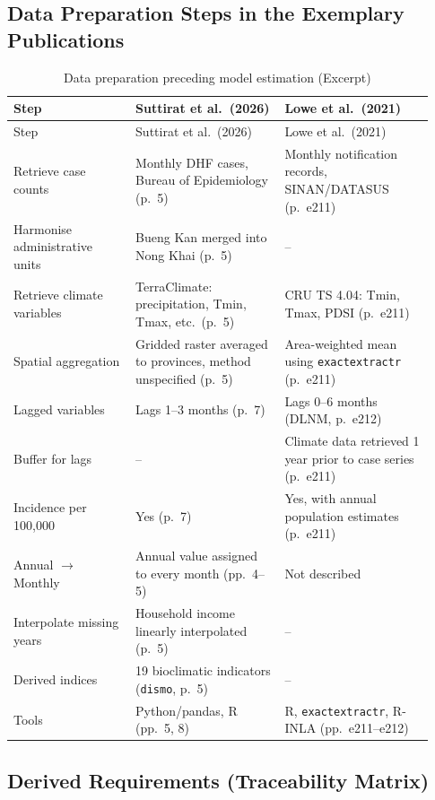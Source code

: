 \documentclass[11pt,a4paper]{article}
\begin{document}
\subsection{Data Preparation Steps in the Exemplary Publications}

\begin{longtable}{@{}p{0.27\linewidth}p{0.33\linewidth}p{0.33\linewidth}@{}}
\caption{Data preparation preceding model estimation (Excerpt)}\label{tab:steps}\\
\toprule
Step & Suttirat et al.\ (2026) & Lowe et al.\ (2021) \\
\midrule
\endfirsthead
\toprule
Step & Suttirat et al.\ (2026) & Lowe et al.\ (2021) \\
\midrule
\endhead
Retrieve case counts & Monthly DHF cases, Bureau of Epidemiology (p.~5) &
  Monthly notification records, SINAN/DATASUS (p.~e211) \\
Harmonise administrative units & Bueng Kan merged into Nong Khai (p.~5) & -- \\
Retrieve climate variables & TerraClimate: precipitation, Tmin, Tmax, etc.\ (p.~5) &
  CRU TS 4.04: Tmin, Tmax, PDSI (p.~e211) \\
Spatial aggregation & Gridded raster averaged to provinces, method unspecified (p.~5) &
  Area-weighted mean using \texttt{exactextractr} (p.~e211) \\
Lagged variables & Lags 1--3 months (p.~7) & Lags 0--6 months (DLNM, p.~e212) \\
Buffer for lags & -- & Climate data retrieved 1 year prior to case series (p.~e211) \\
Incidence per 100,000 & Yes (p.~7) & Yes, with annual population estimates (p.~e211) \\
Annual $\rightarrow$ Monthly & Annual value assigned to every month (pp.~4--5) &
  Not described \\
Interpolate missing years & Household income linearly interpolated (p.~5) & -- \\
Derived indices & 19 bioclimatic indicators (\texttt{dismo}, p.~5) & -- \\
Tools & Python/pandas, R (pp.~5, 8) & R, \texttt{exactextractr}, R-INLA (pp.~e211--e212) \\
\bottomrule
\end{longtable}

\subsection{Derived Requirements (Traceability Matrix)}
\end{document}
